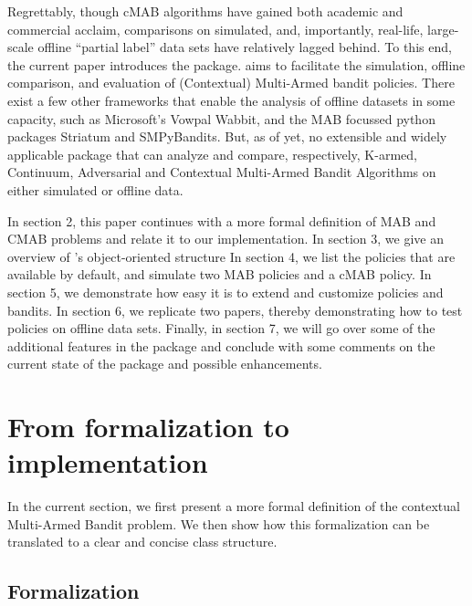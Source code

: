 \documentclass{jss}\usepackage[]{graphicx}\usepackage[]{color}
\begin{document}
Regrettably, though cMAB algorithms have gained both academic and commercial acclaim, comparisons on simulated, and, importantly, real-life, large-scale offline \textquotedblleft{}partial label\textquotedblright{} data sets have relatively lagged behind. To this end, the current paper introduces the   package.  aims to facilitate the simulation, offline comparison, and evaluation of (Contextual) Multi-Armed bandit policies. There exist a few other frameworks that enable the analysis of offline datasets in some capacity, such as Microsoft's Vowpal Wabbit, and the MAB focussed python packages Striatum and SMPyBandits. But, as of yet, no extensible and widely applicable  package that can analyze and compare, respectively, K-armed, Continuum, Adversarial and Contextual Multi-Armed Bandit Algorithms on either simulated or offline data.

In section 2, this paper continues with a more formal definition of MAB and CMAB problems and relate it to our implementation. In section 3, we give an overview of ’s object-oriented structure In section 4, we list the policies that are available by default, and simulate two MAB policies and a cMAB policy. In section 5, we demonstrate how easy it is to extend and customize  policies and bandits. In section 6, we replicate two papers, thereby demonstrating how to test policies on offline data sets. Finally, in section  7, we will go over some of the additional features in the package and conclude with some comments on the current state of the package and possible enhancements.

\section{From formalization to implementation}


In the current section, we first present a more formal definition of the contextual Multi-Armed Bandit problem. We then show how this formalization can be translated to a clear and concise class structure.

\subsection{Formalization}
\end{document}

